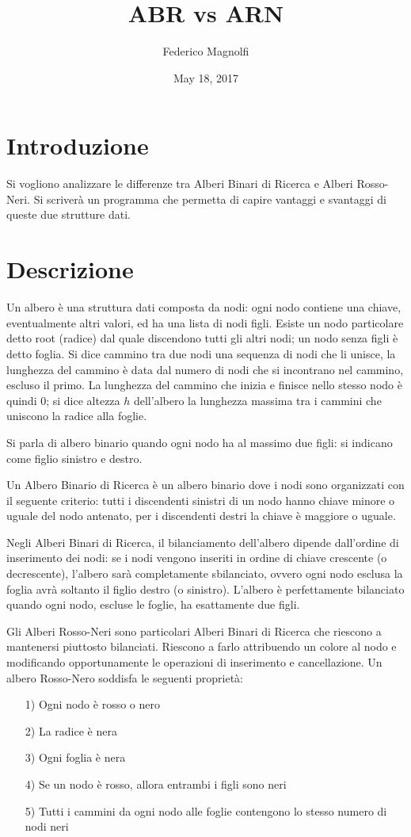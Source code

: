 \documentclass[]{article}
\begin{document}
\title{ABR vs ARN}
\author{Federico Magnolfi}
\date{May 18, 2017}
\maketitle

\section{Introduzione}
Si vogliono analizzare le differenze tra Alberi Binari di Ricerca e Alberi Rosso-Neri. Si scriverà un programma che permetta di capire vantaggi e svantaggi di queste due strutture dati.

\section{Descrizione}
Un albero è una struttura dati composta da nodi: ogni nodo contiene una chiave, eventualmente altri valori, ed ha una lista di nodi figli. Esiste un nodo particolare detto root (radice) dal quale discendono tutti gli altri nodi; un nodo senza figli è detto foglia. Si dice cammino tra due nodi una sequenza di nodi che li unisce, la lunghezza del cammino è data dal numero di nodi che si incontrano nel cammino, escluso il primo. La lunghezza del cammino che inizia e finisce nello stesso nodo è quindi 0; si dice altezza $h$ dell'albero la lunghezza massima tra i cammini che uniscono la radice alla foglie.

Si parla di albero binario quando ogni nodo ha al massimo due figli: si indicano come figlio sinistro e destro.

Un Albero Binario di Ricerca è un albero binario dove i nodi sono organizzati con il seguente criterio: tutti i discendenti sinistri di un nodo hanno chiave minore o uguale del nodo antenato, per i discendenti destri la chiave è maggiore o uguale.

Negli Alberi Binari di Ricerca, il bilanciamento dell'albero dipende dall'ordine di inserimento dei nodi: se i nodi vengono inseriti in ordine di chiave crescente (o decrescente), l'albero sarà completamente sbilanciato, ovvero ogni nodo esclusa la foglia avrà soltanto il figlio destro (o sinistro). L'albero è perfettamente bilanciato quando ogni nodo, escluse le foglie, ha esattamente due figli.

Gli Alberi Rosso-Neri sono particolari Alberi Binari di Ricerca che riescono a mantenersi piuttosto bilanciati. Riescono a farlo attribuendo un colore al nodo e modificando opportunamente le operazioni di inserimento e cancellazione. Un albero Rosso-Nero soddisfa le seguenti proprietà:
\begin{itemize}
\item[1)] Ogni nodo è rosso o nero
\item[2)] La radice è nera
\item[3)] Ogni foglia è nera
\item[4)] Se un nodo è rosso, allora entrambi i figli sono neri
\item[5)] Tutti i cammini da ogni nodo alle foglie contengono lo stesso numero di nodi neri
\end{itemize}
\end{document}

